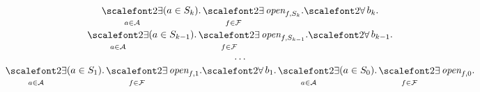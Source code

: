 
\begin{small}
\[
\begin{matrix}
\displaystyle \bigexists_{\a \in \A} \instep{\a}{\depth}. \bigexists_{\f\in \F} \openstep{\f}{\depth}.%
\displaystyle {\bigforall b_{\depth}.}\\
\displaystyle \bigexists_{\a \in \A} \instep{\a}{\depth-1}. \bigexists_{\f\in \F} \openstep{\f}{\depth-1}.%
\displaystyle {\bigforall b_{\depth-1}.}\\
\displaystyle \dots\\ 
\displaystyle \bigexists_{\a \in \A} \instep{\a}{1}. \bigexists_{\f\in \F} \open{\f}{1}.%
\displaystyle {\bigforall b_{1}.}%
\displaystyle \bigexists_{\a \in \A} \instep{\a}{0}. \bigexists_{\f\in \F} \open{\f}{0}.
\end{matrix}
\]
\end{small}\\


